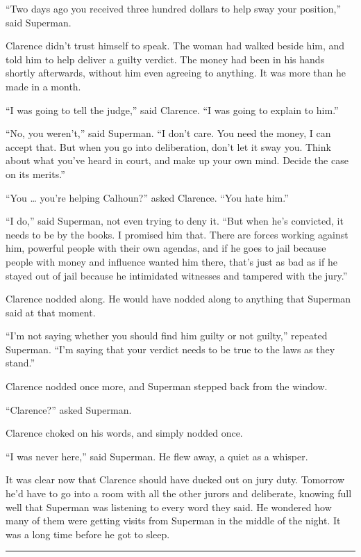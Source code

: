 ``Two days ago you received three hundred dollars to help sway your
position,'' said Superman.

Clarence didn't trust himself to speak. The woman had walked beside him,
and told him to help deliver a guilty verdict. The money had been in his
hands shortly afterwards, without him even agreeing to anything. It was
more than he made in a month.

``I was going to tell the judge,'' said Clarence. ``I was going to
explain to him.''

``No, you weren't,'' said Superman. ``I don't care. You need the money,
I can accept that. But when you go into deliberation, don't let it sway
you. Think about what you've heard in court, and make up your own mind.
Decide the case on its merits.''

``You \ldots{} you're helping Calhoun?'' asked Clarence. ``You hate
him.''

``I do,'' said Superman, not even trying to deny it. ``But when he's
convicted, it needs to be by the books. I promised him that. There are
forces working against him, powerful people with their own agendas, and
if he goes to jail because people with money and influence wanted him
there, that's just as bad as if he stayed out of jail because he
intimidated witnesses and tampered with the jury.''

Clarence nodded along. He would have nodded along to anything that
Superman said at that moment.

``I'm not saying whether you should find him guilty or not guilty,''
repeated Superman. ``I'm saying that your verdict needs to be true to
the laws as they stand.''

Clarence nodded once more, and Superman stepped back from the window.

``Clarence?'' asked Superman.

Clarence choked on his words, and simply nodded once.

``I was never here,'' said Superman. He flew away, a quiet as a whisper.

It was clear now that Clarence should have ducked out on jury duty.
Tomorrow he'd have to go into a room with all the other jurors and
deliberate, knowing full well that Superman was listening to every word
they said. He wondered how many of them were getting visits from
Superman in the middle of the night. It was a long time before he got to
sleep.

\begin{center}\rule{0.5\linewidth}{\linethickness}\end{center}

